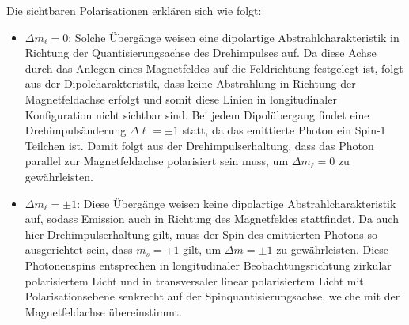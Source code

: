 \documentclass[11pt, a4paper]{article}
\begin{document}
\noindent
Die sichtbaren Polarisationen erklären sich wie folgt:
\begin{itemize}
	\item $\Delta m_\ell = 0$: Solche Übergänge weisen eine dipolartige Abstrahlcharakteristik in Richtung der Quantisierungsachse des Drehimpulses auf.
	Da diese Achse durch das Anlegen eines Magnetfeldes auf die Feldrichtung festgelegt ist, folgt aus der Dipolcharakteristik, dass keine Abstrahlung in Richtung der Magnetfeldachse erfolgt und somit diese Linien in longitudinaler Konfiguration nicht sichtbar sind.
	Bei jedem Dipolübergang findet eine Drehimpulsänderung $\Delta \ell = \pm 1$ statt, da das emittierte Photon ein Spin-1 Teilchen ist.
	Damit folgt aus der Drehimpulserhaltung, dass das Photon parallel zur Magnetfeldachse polarisiert sein muss, um $\Delta m_\ell = 0$ zu gewährleisten.
	
	\item $\Delta m_\ell = \pm 1$: Diese Übergänge weisen keine dipolartige Abstrahlcharakteristik auf, sodass Emission auch in Richtung des Magnetfeldes stattfindet.
	Da auch hier Drehimpulserhaltung gilt, muss der Spin des emittierten Photons so ausgerichtet sein, dass $m_s = \mp 1$ gilt, um $\Delta m = \pm 1$ zu gewährleisten.
	Diese Photonenspins entsprechen in longitudinaler Beobachtungsrichtung zirkular polarisiertem Licht und in transversaler linear polarisiertem Licht mit Polarisationsebene senkrecht auf der Spinquantisierungsachse, welche mit der Magnetfeldachse übereinstimmt.
\end{itemize}
\end{document}
